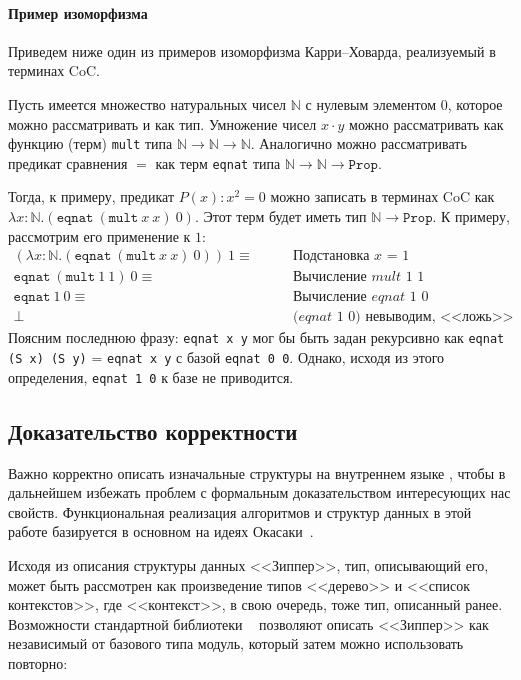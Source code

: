 \paragraph{Пример изоморфизма}
Приведем ниже один из примеров изоморфизма Карри--Ховарда, реализуемый в терминах CoC.

Пусть имеется множество натуральных чисел $\mathbb{N}$ с нулевым элементом $0$, которое можно рассматривать и как тип. Умножение чисел $x \cdot y$ можно рассматривать как функцию (терм) \texttt{mult} типа $\mathbb{N} \rightarrow \mathbb{N} \rightarrow \mathbb{N}$. Аналогично можно рассматривать предикат сравнения $=$ как терм \texttt{eqnat} типа $\mathbb{N} \rightarrow \mathbb{N} \rightarrow \texttt{Prop}$. 

Тогда, к примеру, предикат $P(x):x^2 = 0$ можно записать в терминах CoC как $\lambda x:\mathbb{N}. (\texttt{eqnat}\ (\texttt{mult}\ x\ x)\ 0)$. Этот терм будет иметь тип $\mathbb{N} \rightarrow \texttt{Prop}$. К примеру, рассмотрим его применение к $1$:
\begin{align*}
(\lambda x:\mathbb{N}. (\texttt{eqnat}\ (\texttt{mult}\ x\ x)\ 0))\ 1 \equiv & \qquad \textit{Подстановка x = 1} \\
\texttt{eqnat}\ (\texttt{mult}\ 1\ 1)\ 0 \equiv & \qquad \textit{Вычисление mult 1 1} \\
\texttt{eqnat}\ 1\ 0 \equiv & \qquad \textit{Вычисление eqnat 1 0} \\
\bot & \qquad \textit{(eqnat 1 0) невыводим, <<ложь>>}
\end{align*}
Поясним последнюю фразу: \texttt{eqnat x y} мог бы быть задан рекурсивно как \texttt{eqnat (S x) (S y)} = \texttt{eqnat x y} с базой \texttt{eqnat 0 0}. Однако, исходя из этого определения, \texttt{eqnat 1 0} к базе не приводится.

\subsection{Доказательство корректности}

Важно корректно описать изначальные структуры на внутреннем языке \tcoq, чтобы в дальнейшем избежать проблем с формальным доказательством интересующих нас свойств. Функциональная реализация алгоритмов и структур данных в этой работе базируется в основном на идеях Окасаки~\autocite{Okasaki1996}.

Исходя из описания структуры данных <<Зиппер>>, тип, описывающий его, может быть рассмотрен как произведение типов <<дерево>> и <<список контекстов>>, где <<контекст>>, в свою очередь, тоже тип, описанный ранее. Возможности стандартной библиотеки \tcoq~ позволяют описать <<Зиппер>> как независимый от базового типа модуль, который затем можно использовать повторно:

